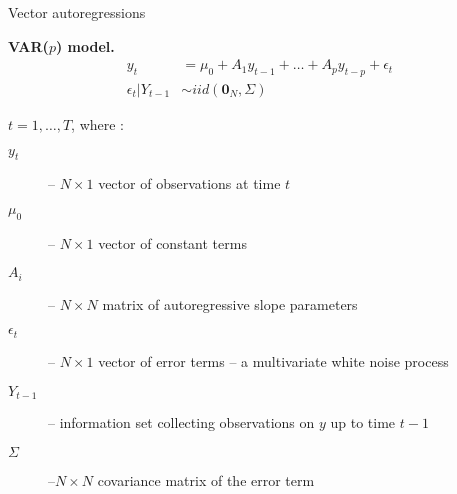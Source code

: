 \documentclass[notes,blackandwhite,mathsans,usenames,dvipsnames]{beamer}
\begin{document}
\begin{frame}{Vector autoregressions}

\textbf{VAR($p$) model.}
\begin{align*}
y_t &= \mu_0 + A_1 y_{t-1} + \dots + A_p y_{t-p} + \epsilon_t\\
\epsilon_t|Y_{t-1} &\sim iid\left(\mathbf{0}_N,\Sigma\right)
\end{align*}

\small
{} $t=1,\dots,T${\color{mcxs2}, where :}
\begin{description}
\item[$y_t$] {\color{mcxs2}--} $N\times 1$ {\color{mcxs2}vector of observations at time} $t$
\item[$\mu_0$] {\color{mcxs2}--} $N\times 1$ {\color{mcxs2}vector of constant terms}
\item[$A_i$] {\color{mcxs2}--} $N\times N$ {\color{mcxs2}matrix of {\color{mcxs1}autoregressive} slope parameters}
\item[$\epsilon_t $] {\color{mcxs2}--} $N\times 1$ {\color{mcxs2}vector of error terms -- a multivariate white noise process}
\item[$Y_{t-1} $] {\color{mcxs2}-- information set collecting observations on} $y$ {\color{mcxs2}up to time} $t-1$
\item[$\Sigma$] {\color{mcxs2}--}$N\times N$ {\color{mcxs2}covariance matrix of the error term}
\end{description}
\end{frame}
\end{document}
